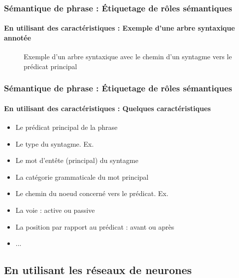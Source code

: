 \documentclass[xcolor=table]{beamer}
\begin{document}
\begin{frame}
	\frametitle{Sémantique de phrase : Étiquetage de rôles sémantiques}
	\framesubtitle{En utilisant des caractéristiques : Exemple d'une arbre syntaxique annotée}
	
	\vspace{-0.2cm}
	\begin{figure}
		\caption{Exemple d'un arbre syntaxique avec le chemin d'un syntagme vers le prédicat principal \cite{2019-jurafsky-martin}}
	\end{figure}
	
\end{frame}

\begin{frame}
	\frametitle{Sémantique de phrase : Étiquetage de rôles sémantiques}
	\framesubtitle{En utilisant des caractéristiques : Quelques caractéristiques}
	
	\begin{itemize}
		\item Le prédicat principal de la phrase
		\item Le type du syntagme. Ex. 
		\item Le mot d'entête (principal) du syntagme
		\item La catégorie grammaticale du mot principal 
		\item Le chemin du noeud concerné vers le prédicat. Ex. 
		\item La voie : active ou passive
		\item La position par rapport au prédicat : avant ou après
		\item ...
	\end{itemize}
	
\end{frame}

\subsection{En utilisant les réseaux de neurones}
\end{document}

